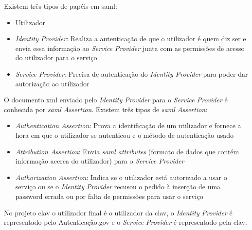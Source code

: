 Existem três tipos de papéis em \acrshort{saml}:~\cite{wisaml}
\begin{itemize}[leftmargin=2cm]
    \item Utilizador
    \item \textit{Identity Provider}: Realiza a autenticação de que o utilizador é quem diz ser e envia essa informação ao \textit{Service Provider} junta com as permissões de acesso do utilizador para o serviço
    \item \textit{Service Provider}: Precisa de autenticação do \textit{Identity Provider} para poder dar autorização ao utilizador
\end{itemize}

O documento \acrshort{xml} enviado pelo \textit{Identity Provider} para o \textit{Service Provider} é conhecida por \textit{\acrshort{saml} Assertion}. Existem três tipos de \textit{\acrshort{saml} Assertion}:~\cite{wisaml}
\begin{itemize}[leftmargin=2cm]
    \item \textit{Authentication Assertion}: Prova a identificação de um utilizador e fornece a hora em que o utilizador se autenticou e o método de autenticação usado
    \item \textit{Attribution Assertion}: Envia \textit{\acrshort{saml} attributes} (formato de dados que contém informação acerca do utilizador) para o \textit{Service Provider}
    \item \textit{Authorization Assertion}: Indica se o utilizador está autorizado a usar o serviço ou se o \textit{Identity Provider} recusou o pedido à inserção de uma password errada ou por falta de permissões para usar o serviço
\end{itemize}

No projeto \acrshort{clav} o utilizador final é o utilizador da \acrshort{clav}, o \textit{Identity Provider} é representado pelo Autenticação.gov e o \textit{Service Provider} é representado pela \acrshort{clav}.





